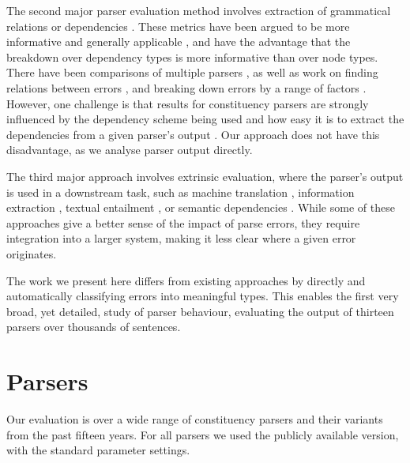 The second major parser evaluation method involves extraction of grammatical
relations \cite{King:2003,Briscoe-Carroll:2006} or dependencies
\cite{Lin:1998,Briscoe-Carroll-Graham-Copestake:2002}.  These metrics have been
argued to be more informative and generally applicable
\cite{Carroll-etal:1998}, and have the advantage that the breakdown over
dependency types is more informative than over node types. There have been
comparisons of multiple parsers \cite{conf/lrec/FosterG08,Nivre:2010,cer2010},
as well as work on finding relations between errors
\cite{Hara:2009:DEA:1699648.1699662}, and breaking down errors by a range of
factors \cite{mcdonald-nivre:2007:EMNLP-CoNLL2007}.  However, one challenge is
that results for constituency parsers are strongly influenced by the dependency
scheme being used and how easy it is to extract the dependencies from a given
parser's output \cite{Clark-Hockenmaier:2002}.  Our approach does not have this
disadvantage, as we analyse parser output directly.

The third major approach involves extrinsic evaluation, where the parser's
output is used in a downstream task, such as
machine translation \cite{Quirk-CorstonOliver:2006},
information extraction \cite{miyao-EtAl:2008:ACLMain},
textual entailment \cite{Yuret-han-turgut:2010}, or
semantic dependencies \cite{Dridan-Oepen:2011}.
While some of these approaches give a better sense of the impact of parse
errors, they require integration into a larger system, making it less clear
where a given error originates.

The work we present here differs from existing approaches by directly and
automatically classifying errors into meaningful types.  This enables the first
very broad, yet detailed, study of parser behaviour, evaluating the output of
thirteen parsers over thousands of sentences.

\section{Parsers}

Our evaluation is over a wide range of \ptb constituency parsers and their
variants from the past fifteen years.  For all parsers we used the publicly
available version, with the standard parameter settings.


